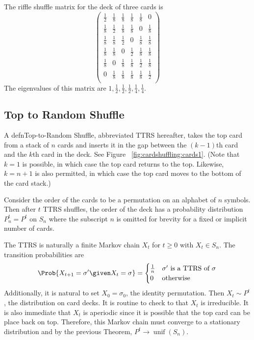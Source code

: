 \documentclass[12pt]{article}
\begin{document}
\begin{example}
    The riffle shuffle matrix for the deck of three cards is
\[
    \begin{pmatrix}
        \frac{1}{2}     & \frac{1}{8}   & \frac{1}{8}   & \frac{1}{8}
        & \frac{1}{8}   & 0 \\
        \frac{1}{8}     & \frac{1}{2}   & \frac{1}{8}   & \frac{1}{8}
        & 0     & \frac{1}{8} \\
        \frac{1}{8}     & \frac{1}{8}   & \frac{1}{2}   & 0     & \frac{1}
        {8}     & \frac{1}{8} \\
        \frac{1}{8}     & \frac{1}{8}   & 0     & \frac{1}{2}   &
        \frac{1}{8}   & \frac{1}{8} \\
        \frac{1}{8}     & 0     & \frac{1}{8}   & \frac{1}{8}   & \frac{1}
        {2}     & \frac{1}{8} \\
        0       & \frac{1}{8}   & \frac{1}{8}   & \frac{1}{8}   & \frac{1}
        {8}     & \frac{1}{2} \\
    \end{pmatrix}
\]
    The eigenvalues of this matrix are \( 1, \frac{1}{2}, \frac{1}{2},
    \frac{1}{2}, \frac{1}{4}, \frac{1}{4} \).
\end{example}

\subsection*{Top to Random Shuffle}

A defn{Top-to-Random Shuffle},%
abbreviated TTRS hereafter, takes the top card from a stack of \( n \)
cards and inserts it in the gap between the \( (k-1) \)th card and the \(
k \)th card in the deck.  See Figure~%
\ref{fig:cardshuffling:cards1}. (Note that \( k = 1 \) is possible, in
which case the top card returns to the top.  Likewise, \( k = n+1 \) is
also permitted, in which case the top card moves to the bottom of the
card stack.)

Consider the order of the cards to be a permutation on an alphabet of \(
n \) symbols.  Then after \( t \) TTRS shuffles, the order of the deck
has a probability distribution \( P^t_n = P^t \) on \( S_n \) where the
subscript \( n \) is omitted for brevity for a fixed or implicit number
of cards.

The TTRS is naturally a finite Markov chain \( X_t \) for \( t \ge 0 \)
with \( X_t \in S_n \).  The transition probabilities are
\[
    \Prob{X_{t+1} = \sigma' \given X_t = \sigma} =
    \begin{cases}
        \frac{1}{n}     & \text{\( \sigma' \) is a TTRS of \( \sigma \)}\\
        0       & \text{otherwise}
    \end{cases}
\] Additionally, it is natural to set \( X_0 = \sigma_0 \), the identity
permutation.  Then \( X_t \sim P^t \), the distribution on card decks.
It is routine to check to that \( X_t \) is irreducible.  It is also
immediate that \( X_t \) is aperiodic since it is possible that the top
card can be place back on top.  Therefore, this Markov chain must
converge to a stationary distribution and by the previous Theorem, \( P^t
\to
\operatorname{unif}
(S_n) \).
\end{document}
